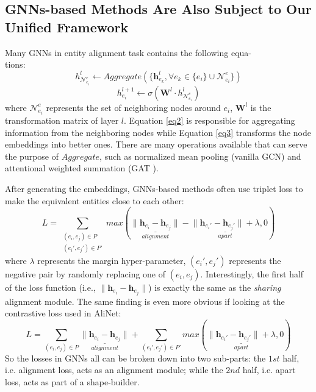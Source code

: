\documentclass[sigconf,camera-ready]{acmart}
\begin{document}
\subsection{GNNs-based Methods Are Also Subject to Our Unified Framework}
\label{4.2}
Many GNNs in entity alignment task contains the following equa-\\tions\cite{DBLP:conf/nips/HamiltonYL17}:
\begin{equation}
h^{l}_{{\mathcal N}_{e_i}^e} \leftarrow {Aggregate}(\{\bm{h}_{e_k}^{l}, \forall e_k \in \{e_i\} \cup {\mathcal N}_{e_i}^e\})
\label{eq2}
\end{equation}
\begin{equation}
h^{l+1}_{e_i} \leftarrow \sigma\left(\bm{W}^l\cdot h^{l}_{\mathcal N_{e_i}^e}\right)
\label{eq3}
\end{equation}
where ${\mathcal N}_{e_i}^e$ represents the set of neighboring nodes around $e_i$, $\bm{W}^l$ is the transformation matrix of layer $l$.
Equation \ref{eq2} is responsible for aggregating information from the neighboring nodes while Equation \ref{eq3} transforms the node embeddings into better ones.
There are many operations available that can serve the purpose of $Aggregate$, such as normalized mean pooling (vanilla GCN\cite{DBLP:conf/iclr/KipfW17}) and attentional weighted summation (GAT \cite{DBLP:conf/iclr/VelickovicCCRLB18}).

After generating the embeddings, GNNs-based methods often use triplet loss to make the equivalent entities close to each other:
\begin{equation}
L=\sum_{\substack{(e_i,e_j)\in P\\(e_i',e_j')\in P'}}max\left(\underset{alignment}{\underline{\|\bm{h}_{e_i}-\bm{h}_{e_j}\|}}-\underset{apart}{\underline{\|\bm{h}_{e_i'}-\bm{h}_{e_j'}\|+\lambda}},0\right)
\end{equation}
where $\lambda$ represents the margin hyper-parameter, $(e_i',e_j')$ represents the negative pair by randomly replacing one of $(e_i,e_j)$.
Interestingly, the first half of the loss function (i.e., $\|\bm{h}_{e_i}-\bm{h}_{e_j}\|$) is exactly the same as the \emph{sharing} alignment module.
The same finding is even more obvious if looking at the contrastive loss used in AliNet\cite{sun2019knowledge}:
\begin{equation}
L=\sum_{(e_i,e_j)\in P}\underset{alignment}{\underline{\|\bm{h}_{e_i}-\bm{h}_{e_j}\|}}+\sum_{(e_i',e_j')\in P'}max\left(\underset{apart}{\underline{\|\bm{h}_{e_i'}-\bm{h}_{e_j'}\|+\lambda}},0\right)
\end{equation}
So the losses in GNNs all can be broken down into two sub-parts: the $1st$ half, i.e. alignment loss, acts as an alignment module; while the $2nd$ half, i.e. apart loss, acts as part of a shape-builder.
\end{document}
